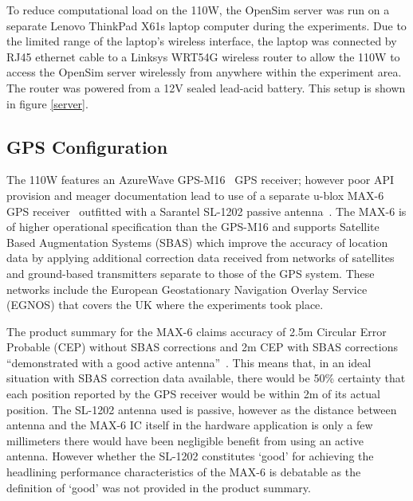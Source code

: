 To reduce computational load on the 110W, the OpenSim server was run on a separate Lenovo ThinkPad X61s laptop computer during the experiments. Due to the limited range of the laptop's wireless interface, the laptop was connected by RJ45 ethernet cable to a Linksys WRT54G wireless router to allow the 110W to access the OpenSim server wirelessly from anywhere within the experiment area. The router was powered from a 12V sealed lead-acid battery. This setup is shown in figure \ref{server}.


\subsection{GPS Configuration}
The 110W features an AzureWave GPS-M16~\cite{AzureWave} GPS receiver; however poor API provision and meager documentation lead to use of a separate u-blox MAX-6 GPS receiver~\cite{U-bloxAG} outfitted with a Sarantel SL-1202 passive antenna~\cite{Sarantel}. The MAX-6 is of higher operational specification than the GPS-M16 and supports Satellite Based Augmentation Systems (SBAS) which improve the accuracy of location data by applying additional correction data received from networks of satellites and ground-based transmitters separate to those of the GPS system. These networks include the European Geostationary Navigation Overlay Service (EGNOS) that covers the UK where the experiments took place.

The product summary for the MAX-6 claims accuracy of 2.5m Circular Error Probable (CEP) without SBAS corrections and 2m CEP with SBAS corrections ``demonstrated with a good active antenna''~\cite{U-bloxAG2012}. This means that, in an ideal situation with SBAS correction data available, there would be 50\% certainty that each position reported by the GPS receiver would be within 2m of its actual position. The SL-1202 antenna used is passive, however as the distance between antenna and the MAX-6 IC itself in the hardware application is only a few millimeters there would have been negligible benefit from using an active antenna. However whether the SL-1202 constitutes `good' for achieving the headlining performance characteristics of the MAX-6 is debatable as the definition of `good' was not provided in the product summary.

